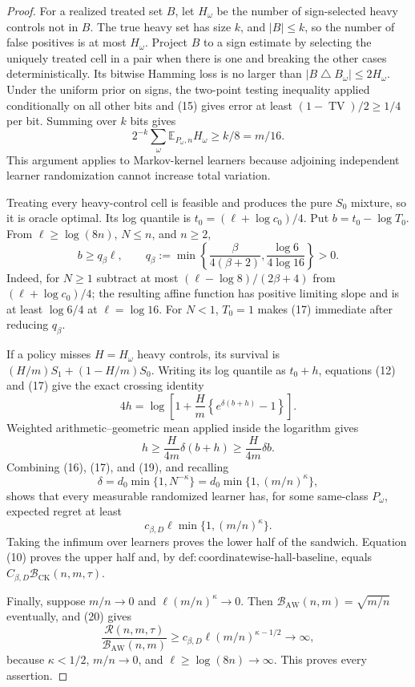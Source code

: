\documentclass{article}
\begin{document}
\begin{proof}
For a realized treated set \(B\), let \(H_\omega\) be the number of sign-selected heavy controls not in \(B\).  The true heavy set has size \(k\), and \(|B|\leq k\), so the number of false positives is at most \(H_\omega\).  Project \(B\) to a sign estimate by selecting the uniquely treated cell in a pair when there is one and breaking the other cases deterministically.  Its bitwise Hamming loss is no larger than \(|B\mathbin\triangle B_\omega|\leq2H_\omega\).  Under the uniform prior on signs, the two-point testing inequality applied conditionally on all other bits and (15) gives error at least \((1-\operatorname{TV})/2\geq1/4\) per bit.  Summing over \(k\) bits gives
\[
2^{-k}\sum_\omega\mathbb E_{P_\omega,n}H_\omega\geq k/8=m/16.         \tag{16}
\]
This argument applies to Markov-kernel learners because adjoining independent learner randomization cannot increase total variation.

Treating every heavy-control cell is feasible and produces the pure \(S_0\) mixture, so it is oracle optimal.  Its log quantile is \(t_0=(\ell+\log c_0)/4\).  Put \(b=t_0-\log T_0\).  From \(\ell\geq\log(8n)\), \(N\leq n\), and \(n\geq2\),
\[
b\geq q_\beta\ell,
\qquad
q_\beta:=\min\left\{\frac\beta{4(\beta+2)},\frac{\log6}{4\log16}\right\}>0. \tag{17}
\]
Indeed, for \(N\geq1\) subtract at most \((\ell-\log8)/(2\beta+4)\) from \((\ell+\log c_0)/4\); the resulting affine function has positive limiting slope and is at least \(\log6/4\) at \(\ell=\log16\).  For \(N<1\), \(T_0=1\) makes (17) immediate after reducing \(q_\beta\).

If a policy misses \(H=H_\omega\) heavy controls, its survival is \((H/m)S_1+(1-H/m)S_0\).  Writing its log quantile as \(t_0+h\), equations (12) and (17) give the exact crossing identity
\[
4h=\log\left[1+\frac Hm\left\{e^{\delta(b+h)}-1\right\}\right].          \tag{18}
\]
Weighted arithmetic--geometric mean applied inside the logarithm gives
\[
h\geq\frac{H}{4m}\delta(b+h)\geq\frac{H}{4m}\delta b.                  \tag{19}
\]
Combining (16), (17), and (19), and recalling
\[
\delta=d_0\min\{1,N^{-\kappa}\}
=d_0\min\{1,(m/n)^\kappa\},
\]
shows that every measurable randomized learner has, for some same-class \(P_\omega\), expected regret at least
\[
c_{\beta,D}\ell\min\{1,(m/n)^\kappa\}.                                 \tag{20}
\]
Taking the infimum over learners proves the lower half of the sandwich.  Equation (10) proves the upper half and, by \(\mathrm{def{:}coordinatewise\text{-}hall\text{-}baseline}\), equals \(C_{\beta,D}\mathcal B_{\mathrm{CK}}(n,m,\tau)\).

Finally, suppose \(m/n\to0\) and \(\ell(m/n)^\kappa\to0\).  Then \(\mathcal B_{\mathrm{AW}}(n,m)=\sqrt{m/n}\) eventually, and (20) gives
\[
\frac{\mathcal R(n,m,\tau)}{\mathcal B_{\mathrm{AW}}(n,m)}
\geq c_{\beta,D}\ell(m/n)^{\kappa-1/2}\longrightarrow\infty,
\]
because \(\kappa<1/2\), \(m/n\to0\), and \(\ell\geq\log(8n)\to\infty\).  This proves every assertion.
\end{proof}
\end{document}

